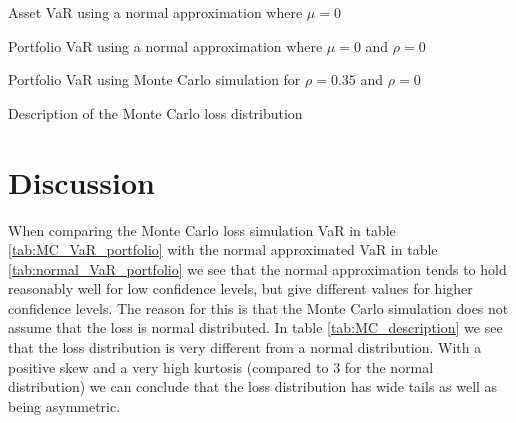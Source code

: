 \documentclass[a4paper]{article}
\begin{document}
\begin{table}[H]
    \centering
    \caption{Asset VaR using a normal approximation where $\mu = 0$}
    \label{tab:normal_VaR_asset}
    
\end{table}

\begin{table}[H]
    \centering
    \caption{Portfolio VaR using a normal approximation where $\mu = 0$ and $\rho = 0$}
    \label{tab:normal_VaR_portfolio}
    
\end{table}

\begin{table}[H]
    \centering
    \caption{Portfolio VaR using Monte Carlo simulation for $\rho = 0.35$ and $\rho = 0$}
    \label{tab:MC_VaR_portfolio}
    
\end{table}

\begin{table}[H]
    \centering
    \caption{Description of the Monte Carlo loss distribution}
    \label{tab:MC_description}
    
\end{table}

\section{Discussion}
When comparing the Monte Carlo loss simulation VaR in table \ref{tab:MC_VaR_portfolio} with the normal approximated VaR in table \ref{tab:normal_VaR_portfolio} we see that the normal approximation tends to hold reasonably well for low confidence levels, but give different values for higher confidence levels. The reason for this is that the Monte Carlo simulation does not assume that the loss is normal distributed. In table \ref{tab:MC_description} we see that the loss distribution is very different from a normal distribution. With a positive skew and a very high kurtosis (compared to $3$ for the normal distribution) we can conclude that the loss distribution has wide tails as well as being asymmetric.
\end{document}
